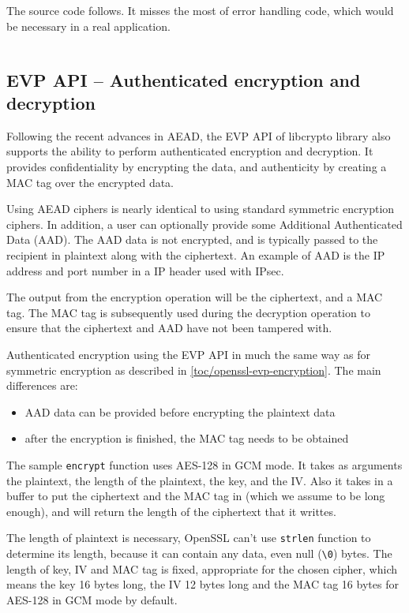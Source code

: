 The source code follows. It misses the most of error handling code, which would be necessary in a real application.

\inputminted{c}{code/openssl-evp-decrypt.c}


\subsection{EVP API -- Authenticated encryption and decryption}
\label{toc/openssl-evp-aead-encryption}

Following the recent advances in AEAD, the EVP API of libcrypto library also supports the ability to perform authenticated encryption and decryption. It provides confidentiality by encrypting the data, and authenticity by creating a MAC tag over the encrypted data.

Using AEAD ciphers is nearly identical to using standard symmetric encryption ciphers. In addition, a user can optionally provide some Additional Authenticated Data (AAD). The AAD data is not encrypted, and is typically passed to the recipient in plaintext along with the ciphertext. An example of AAD is the IP address and port number in a IP header used with IPsec.

The output from the encryption operation will be the ciphertext, and a MAC tag. The MAC tag is subsequently used during the decryption operation to ensure that the ciphertext and AAD have not been tampered with.

Authenticated encryption using the EVP API in much the same way as for symmetric encryption as described in \autoref{toc/openssl-evp-encryption}. The main differences are:

\begin{itemize}
  \item AAD data can be provided before encrypting the plaintext data
  \item after the encryption is finished, the MAC tag needs to be obtained
\end{itemize}

The sample \texttt{encrypt} function uses AES-128 in GCM mode. It takes as arguments the plaintext, the length of the plaintext, the key, and the IV. Also it takes in a buffer to put the ciphertext and the MAC tag in (which we assume to be long enough), and will return the length of the ciphertext that it writtes.

The length of plaintext is necessary, OpenSSL can't use \texttt{strlen} function to determine its length, because it can contain any data, even null (\texttt{\textbackslash0}) bytes. The length of key, IV and MAC tag is fixed, appropriate for the chosen cipher, which means the key 16 bytes long, the IV 12 bytes long and the MAC tag 16 bytes for AES-128 in GCM mode by default.

